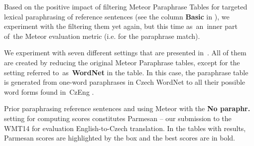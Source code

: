 Based on the positive impact of filtering Meteor Paraphrase Tables for targeted lexical paraphrasing of reference sentences
(see the column \textbf{Basic} in ), we experiment with the 
filtering them yet again, but this time as~an~inner part of~the Meteor evaluation metric (i.e. for the
paraphrase match).

We experiment with seven different settings that are presented in~. All of them are 
created by reducing the original Meteor Paraphrase tables, except for the setting referred 
to~as~\textbf{WordNet} in the table. In this case, the paraphrase table is generated from one-word paraphrases in 
Czech WordNet to all their possible word forms found in~CzEng \cite{czeng10:lrec2012}.

Prior paraphrasing reference sentences and using Meteor with the \textbf{No paraphr.} setting
for computing scores constitutes Parmesan -- our submission to the WMT14 for evaluation English-to-Czech 
translation. In the tables with results, Parmesan scores are highlighted by the box and the best scores
are in bold. %

\begin{table*}[htb]
\begin{center}

\vspace{10pt}

\caption{Pearson's correlation of Meteor and the silver standard.}
\label{results:12:13}
\end{center}
\end{table*}


